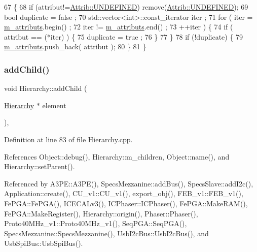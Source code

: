 \begin{DoxyCode}
67                             \{
68     \textcolor{keywordflow}{if} (attribut!=\hyperlink{classAttrib_a69e171d7cc6417835a5a306d3c764235a3a8da2ab97dda18aebab196fe4100531}{Attrib::UNDEFINED}) \textcolor{keyword}{remove}(\hyperlink{classAttrib_a69e171d7cc6417835a5a306d3c764235a3a8da2ab97dda18aebab196fe4100531}{Attrib::UNDEFINED});
69     \textcolor{keywordtype}{bool} duplicate = false ;
70     std::vector<int>::const\_iterator iter ;
71     \textcolor{keywordflow}{for} ( iter  = \hyperlink{classAttrib_ac4bd58a0cc6b38a3b711d609a3d3aacc}{m\_attributs}.begin() ;
72           iter != \hyperlink{classAttrib_ac4bd58a0cc6b38a3b711d609a3d3aacc}{m\_attributs}.end()   ;
73           ++iter ) \{
74       \textcolor{keywordflow}{if} ( attribut == (*iter) ) \{
75         duplicate = true ;
76       \}
77     \}
78     \textcolor{keywordflow}{if} (!duplicate) \{
79       \hyperlink{classAttrib_ac4bd58a0cc6b38a3b711d609a3d3aacc}{m\_attributs}.push\_back( attribut );
80     \}
81   \}
\end{DoxyCode}
\mbox{\label{classHierarchy_ad677774ff38fcb257c04a3a10d471fac}} 
\subsubsection{\texorpdfstring{add\+Child()}{addChild()}}
{\footnotesize\ttfamily void Hierarchy\+::add\+Child (\begin{DoxyParamCaption}\item[{\hyperlink{classHierarchy}{Hierarchy} $\ast$}]{element }\end{DoxyParamCaption})\hspace{0.3cm}{\ttfamily [virtual]}, {\ttfamily [inherited]}}



Definition at line 83 of file Hierarchy.\+cpp.



References Object\+::debug(), Hierarchy\+::m\+\_\+children, Object\+::name(), and Hierarchy\+::set\+Parent().



Referenced by A3\+P\+E\+::\+A3\+P\+E(), Specs\+Mezzanine\+::add\+Bus(), Specs\+Slave\+::add\+I2c(), Application\+::create(), C\+U\+\_\+v1\+::\+C\+U\+\_\+v1(), export\+\_\+obj(), F\+E\+B\+\_\+v1\+::\+F\+E\+B\+\_\+v1(), Fe\+P\+G\+A\+::\+Fe\+P\+G\+A(), I\+C\+E\+C\+A\+Lv3(), I\+C\+Phaser\+::\+I\+C\+Phaser(), Fe\+P\+G\+A\+::\+Make\+R\+A\+M(), Fe\+P\+G\+A\+::\+Make\+Register(), Hierarchy\+::origin(), Phaser\+::\+Phaser(), Proto40\+M\+Hz\+\_\+v1\+::\+Proto40\+M\+Hz\+\_\+v1(), Seq\+P\+G\+A\+::\+Seq\+P\+G\+A(), Specs\+Mezzanine\+::\+Specs\+Mezzanine(), Usb\+I2c\+Bus\+::\+Usb\+I2c\+Bus(), and Usb\+Spi\+Bus\+::\+Usb\+Spi\+Bus().


